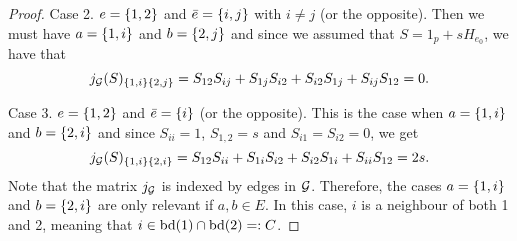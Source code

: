 \begin{proof}
    Case 2. $e = {\left\{1, 2\right\}}$ and $\bar e = {\left\{i, j\right\}}$ with $i \neq j$ (or the opposite). Then we must have $a = {\left\{1, i\right\}}$ and $b = {\left\{2, j\right\}}$ and since we assumed that $S = 1_p + s H_{e_0}$, we have that
    \begin{equation*}
        j_{\mathcal{G}}(S)_{{\left\{1, i\right\}} {\left\{2, j\right\}}} = S_{1 2}S_{i j} + S_{1 j} S_{i 2} + S_{i 2} S_{1 j} + S_{i j} S_{1 2} = 0.
    \end{equation*}

    Case 3. $e = {\left\{1, 2\right\}}$ and $\bar e = {\left\{i\right\}}$ (or the opposite). This is the case when $a = {\left\{1, i\right\}}$ and $b = {\left\{2, i\right\}}$ and since $S_{i i} = 1$, $S_{1, 2} = s$ and $S_{i 1} = S_{i 2} = 0$, we get
    \begin{equation*}
        j_{\mathcal{G}}(S)_{{\left\{1, i\right\}} {\left\{2, i\right\}}} = 
        S_{1 2}S_{i i} + S_{1 i} S_{i 2} + S_{i 2} S_{1 i} + S_{i i} S_{1 2} = 2 s.
    \end{equation*}
    Note that the matrix $j_{\mathcal{G}}$ is indexed by edges in ${\mathcal{G}}$. Therefore, the cases $a = {\left\{1, i\right\}}$ and $b = {\left\{2, i\right\}}$ are only relevant if $a, b \in E$. In this case, $i$ is a neighbour of both 1 and 2, meaning that $i \in {\textrm{bd}}(1) \cap {\textrm{bd}}(2) =: C$.


\end{proof}
